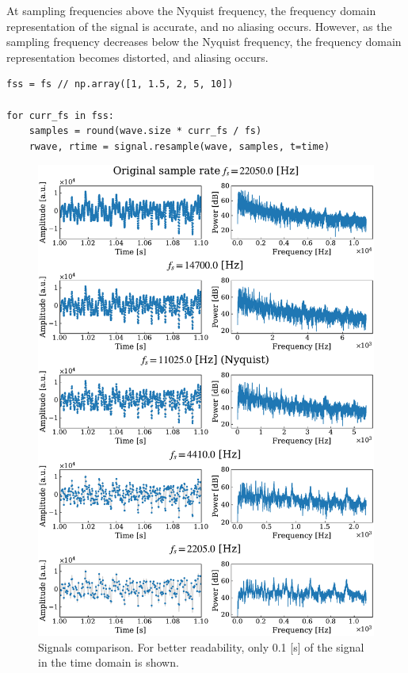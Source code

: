 \documentclass[13pt,a4paper]{article}
\begin{document}
At sampling frequencies above the Nyquist frequency, the frequency domain representation of the signal is accurate, and no aliasing occurs. However, as the sampling frequency decreases below the Nyquist frequency, the frequency domain representation becomes distorted, and aliasing occurs.

\begin{lstlisting}[caption={\textbf{Code snippet for gradual decimation of the signal.}}]
fss = fs // np.array([1, 1.5, 2, 5, 10])

for curr_fs in fss:
    samples = round(wave.size * curr_fs / fs)
    rwave, rtime = signal.resample(wave, samples, t=time)
\end{lstlisting}

\begin{figure}[ht!]
    \centering
    \includegraphics[width=\linewidth]{sampling_thorem.pdf}
    \caption{Signals comparison. For better readability, only 0.1 [s] of the signal in the time domain is shown.}
    \label{fig:sampling_thorem}
\end{figure}
\clearpage
\end{document}
